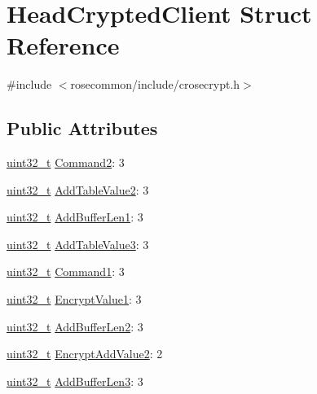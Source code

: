 \hypertarget{structHeadCryptedClient}{}\section{Head\+Crypted\+Client Struct Reference}
\label{structHeadCryptedClient}


{\ttfamily \#include $<$rosecommon/include/crosecrypt.\+h$>$}

\subsection*{Public Attributes}
\begin{DoxyCompactItemize}
\item 
\hyperlink{stdint_8h_a435d1572bf3f880d55459d9805097f62}{uint32\+\_\+t} \hyperlink{structHeadCryptedClient_aba403d502be61522b737377a7de79e5e}{Command2}\+: 3
\item 
\hyperlink{stdint_8h_a435d1572bf3f880d55459d9805097f62}{uint32\+\_\+t} \hyperlink{structHeadCryptedClient_ab17df084747d97069ccdd91225da7af7}{Add\+Table\+Value2}\+: 3
\item 
\hyperlink{stdint_8h_a435d1572bf3f880d55459d9805097f62}{uint32\+\_\+t} \hyperlink{structHeadCryptedClient_a4024d60a84c300f6baa228b0425ff70f}{Add\+Buffer\+Len1}\+: 3
\item 
\hyperlink{stdint_8h_a435d1572bf3f880d55459d9805097f62}{uint32\+\_\+t} \hyperlink{structHeadCryptedClient_a7aaf9ba3ddbd2602d6ddfb0da00e346d}{Add\+Table\+Value3}\+: 3
\item 
\hyperlink{stdint_8h_a435d1572bf3f880d55459d9805097f62}{uint32\+\_\+t} \hyperlink{structHeadCryptedClient_a26111b3a6aba32bc26e342962976943b}{Command1}\+: 3
\item 
\hyperlink{stdint_8h_a435d1572bf3f880d55459d9805097f62}{uint32\+\_\+t} \hyperlink{structHeadCryptedClient_a71f4e050ac9070bbf765bf5050278ee9}{Encrypt\+Value1}\+: 3
\item 
\hyperlink{stdint_8h_a435d1572bf3f880d55459d9805097f62}{uint32\+\_\+t} \hyperlink{structHeadCryptedClient_a9cd34a8cdbf5e60e00e2258d176e0fc9}{Add\+Buffer\+Len2}\+: 3
\item 
\hyperlink{stdint_8h_a435d1572bf3f880d55459d9805097f62}{uint32\+\_\+t} \hyperlink{structHeadCryptedClient_ac213159112b8f60aa4b68b55b2ee7080}{Encrypt\+Add\+Value2}\+: 2
\item 
\hyperlink{stdint_8h_a435d1572bf3f880d55459d9805097f62}{uint32\+\_\+t} \hyperlink{structHeadCryptedClient_a6c19cb626cb99e0ea765837c66f2d9dc}{Add\+Buffer\+Len3}\+: 3

\end{DoxyCompactItemize}
